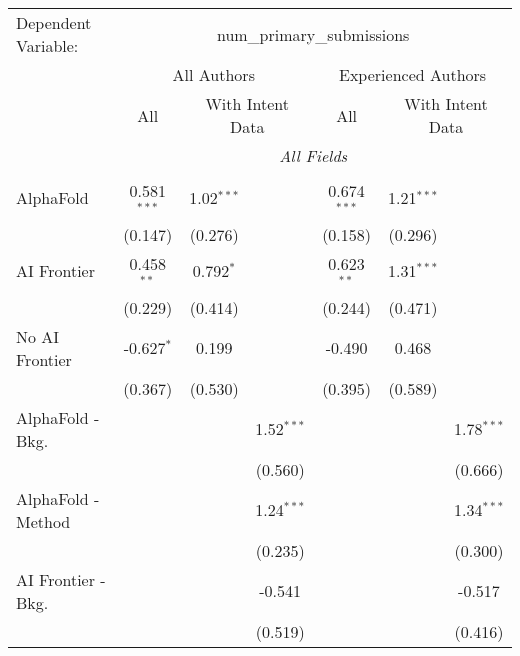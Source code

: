 \begingroup
\centering
\begin{tabular}{lcccccc}
   \tabularnewline \midrule \midrule
   Dependent Variable: & \multicolumn{6}{c}{num\_primary\_submissions}\\
 & \multicolumn{3}{c}{All Authors} & \multicolumn{3}{c}{Experienced Authors} \\
\cmidrule(lr){2-4} \cmidrule(lr){5-7}
 & \multicolumn{1}{c}{All} & \multicolumn{2}{c}{With Intent Data} & \multicolumn{1}{c}{All} & \multicolumn{2}{c}{With Intent Data} \\
\cmidrule(lr){2-2} \cmidrule(lr){3-4} \cmidrule(lr){5-5} \cmidrule(lr){6-7}
 & \multicolumn{6}{c}{\textit{All Fields}} \\ \\
   AlphaFold               & 0.581$^{***}$ & 1.02$^{***}$ &              & 0.674$^{***}$ & 1.21$^{***}$ &   \\   
                           & (0.147)       & (0.276)      &              & (0.158)       & (0.296)      &   \\   
   AI Frontier             & 0.458$^{**}$  & 0.792$^{*}$  &              & 0.623$^{**}$  & 1.31$^{***}$ &   \\   
                           & (0.229)       & (0.414)      &              & (0.244)       & (0.471)      &   \\   
   No AI Frontier          & -0.627$^{*}$  & 0.199        &              & -0.490        & 0.468        &   \\   
                           & (0.367)       & (0.530)      &              & (0.395)       & (0.589)      &   \\   
   AlphaFold - Bkg.        &               &              & 1.52$^{***}$ &               &              & 1.78$^{***}$\\   
                           &               &              & (0.560)      &               &              & (0.666)\\   
   AlphaFold - Method      &               &              & 1.24$^{***}$ &               &              & 1.34$^{***}$\\   
                           &               &              & (0.235)      &               &              & (0.300)\\   
   AI Frontier - Bkg.      &               &              & -0.541       &               &              & -0.517\\   
                           &               &              & (0.519)      &               &              & (0.416)\\   

\end{tabular}
